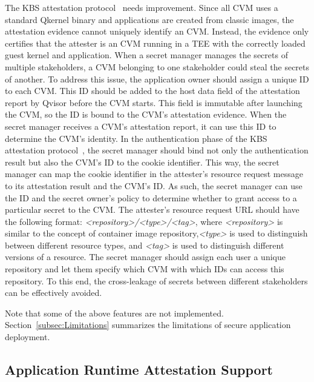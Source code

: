 \label{eq:1}The KBS attestation protocol~\cite*{kbs_Attestation_protocol} needs improvement. Since all \acrshort{CVM} uses a standard Qkernel binary and applications are created from classic images, the attestation evidence cannot uniquely identify an \acrshort{CVM}. Instead, the evidence only certifies that the attester is an \acrshort{CVM} running in a TEE with the correctly 
loaded guest kernel and application. When a secret manager manages the secrets of multiple stakeholders, a \acrshort{CVM} belonging to one stakeholder could steal the secrets of another. To address this issue, the application owner should assign a unique ID to each CVM. This ID should be added to the host data field of the attestation report by Qvisor before 
the \acrshort{CVM} starts. This field is immutable after launching the \acrshort{CVM}, so the ID is bound to the \acrshort{CVM}'s attestation evidence. When the secret manager receives a \acrshort{CVM}'s attestation report, it can use this ID to determine the \acrshort{CVM}'s identity. In the authentication phase of the KBS attestation 
protocol~\cite*{kbs_Attestation_protocol}, the secret manager should bind not only the authentication result but also the \acrshort{CVM}'s ID to the cookie identifier. This way, the secret manager can map the cookie identifier in the attester's resource request message to its attestation result and the \acrshort{CVM}'s ID. As such, the secret manager can use the 
ID and the secret owner's policy to determine whether to grant access to a particular secret to the \acrshort{CVM}. The attester's resource request URL should have the following format: \emph{<repository>/<type>/<tag>}, where \emph{<repository>} is similar to the concept of container image repository,\emph{<type>} is used to distinguish between different resource 
types, and \emph{<tag>} is used to distinguish different versions of a resource. The secret manager should assign each user a unique repository and let them specify which \acrshort{CVM} with which IDs can access this repository. To this end, the cross-leakage of secrets between different stakeholders can be effectively avoided. 


Note that some of the above features are not implemented. Section~\ref{subsec:Limitations} summarizes the limitations of secure application deployment.

\subsection{Application Runtime Attestation Support}
\label{sec:runtime_attesation}

